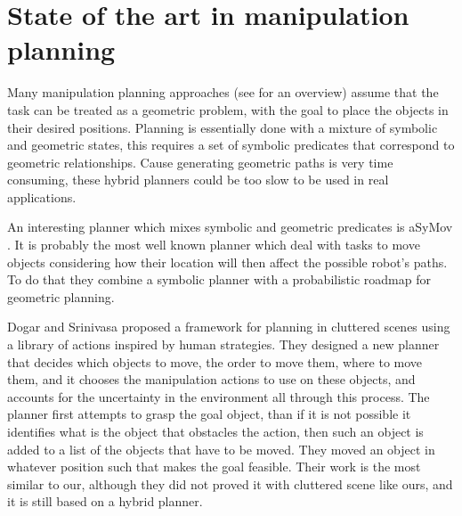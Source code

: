 \chapter{State of the art in manipulation planning}
\label{ch:state_of_the_art}

Many manipulation planning approaches (see \citep{PlanningAlgorithms} for an overview) assume that the task can be treated as a geometric problem, with the goal to place the objects in their desired positions. Planning is essentially done with a mixture of symbolic and geometric states, this
requires a set of symbolic predicates that correspond to geometric
relationships. Cause generating geometric paths is very time consuming, these hybrid planners could be too slow to be used in real applications.  



An interesting planner which mixes symbolic and geometric predicates is
aSyMov \citep{aSyMov}. It is probably the most well known planner which deal with tasks to move objects considering how their location will then affect the possible robot's paths. To do that they combine a symbolic planner with a probabilistic roadmap \citep{Visility-based-PRM} for geometric planning. 

Dogar and Srinivasa \cite{Dogar2011} proposed a framework for planning in cluttered scenes using a library of actions inspired by human strategies. They designed a new planner that decides which
objects to move, the order to move them, where to move them, and it chooses the manipulation actions
to use on these objects, and accounts for the uncertainty
in the environment all through this process. 
The planner first attempts to grasp the goal object, than if it is not possible it identifies what is the object that obstacles  the action, then such an object is added to a list of the objects that have to be moved. They moved an object in whatever position such that makes the goal feasible. 
Their work is the most similar to our, although they did not proved it with cluttered scene like ours, and it is still based on a hybrid planner. 

